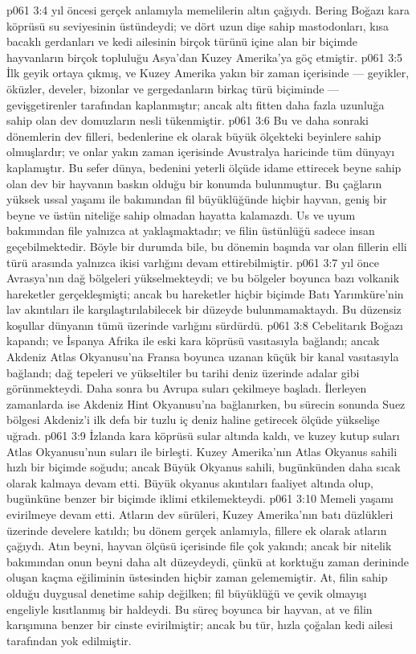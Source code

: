 \vs p061 3:4  yıl öncesi gerçek anlamıyla memelilerin altın çağıydı. Bering Boğazı kara köprüsü su seviyesinin üstündeydi; ve dört uzun dişe sahip mastodonları, kısa bacaklı gerdanları ve kedi ailesinin birçok türünü içine alan bir biçimde hayvanların birçok topluluğu Asya’dan Kuzey Amerika’ya göç etmiştir.
\vs p061 3:5 İlk geyik ortaya çıkmış, ve Kuzey Amerika yakın bir zaman içerisinde --- geyikler, öküzler, develer, bizonlar ve gergedanların birkaç türü biçiminde --- gevişgetirenler tarafından kaplanmıştır; ancak altı fitten daha fazla uzunluğa sahip olan dev domuzların nesli tükenmiştir.
\vs p061 3:6 Bu ve daha sonraki dönemlerin dev filleri, bedenlerine ek olarak büyük ölçekteki beyinlere sahip olmuşlardır; ve onlar yakın zaman içerisinde Avustralya haricinde tüm dünyayı kaplamıştır. Bu sefer dünya, bedenini yeterli ölçüde idame ettirecek beyne sahip olan dev bir hayvanın baskın olduğu bir konumda bulunmuştur. Bu çağların yüksek ussal yaşamı ile bakımından fil büyüklüğünde hiçbir hayvan, geniş bir beyne ve üstün niteliğe sahip olmadan hayatta kalamazdı. Us ve uyum bakımından file yalnızca at yaklaşmaktadır; ve filin üstünlüğü sadece insan geçebilmektedir. Böyle bir durumda bile, bu dönemin başında var olan fillerin elli türü arasında yalnızca ikisi varlığını devam ettirebilmiştir.
\vs p061 3:7  yıl önce Avrasya’nın dağ bölgeleri yükselmekteydi; ve bu bölgeler boyunca bazı volkanik hareketler gerçekleşmişti; ancak bu hareketler hiçbir biçimde Batı Yarımküre’nin lav akıntıları ile karşılaştırılabilecek bir düzeyde bulunmamaktaydı. Bu düzensiz koşullar dünyanın tümü üzerinde varlığını sürdürdü.
\vs p061 3:8 Cebelitarık Boğazı kapandı; ve İspanya Afrika ile eski kara köprüsü vasıtasıyla bağlandı; ancak Akdeniz Atlas Okyanusu’na Fransa boyunca uzanan küçük bir kanal vasıtasıyla bağlandı; dağ tepeleri ve yükseltiler bu tarihi deniz üzerinde adalar gibi görünmekteydi. Daha sonra bu Avrupa suları çekilmeye başladı. İlerleyen zamanlarda ise Akdeniz Hint Okyanusu’na bağlanırken, bu sürecin sonunda Suez bölgesi Akdeniz’i ilk defa bir tuzlu iç deniz haline getirecek ölçüde yükselişe uğradı.
\vs p061 3:9 İzlanda kara köprüsü sular altında kaldı, ve kuzey kutup suları Atlas Okyanusu’nun suları ile birleşti. Kuzey Amerika’nın Atlas Okyanus sahili hızlı bir biçimde soğudu; ancak Büyük Okyanus sahili, bugünkünden daha sıcak olarak kalmaya devam etti. Büyük okyanus akıntıları faaliyet altında olup, bugünküne benzer bir biçimde iklimi etkilemekteydi.
\vs p061 3:10 Memeli yaşamı evirilmeye devam etti. Atların dev sürüleri, Kuzey Amerika’nın batı düzlükleri üzerinde develere katıldı; bu dönem gerçek anlamıyla, fillere ek olarak atların çağıydı. Atın beyni, hayvan ölçüsü içerisinde file çok yakındı; ancak bir nitelik bakımından onun beyni daha alt düzeydeydi, çünkü at korktuğu zaman derininde oluşan kaçma eğiliminin üstesinden hiçbir zaman gelememiştir. At, filin sahip olduğu duygusal denetime sahip değilken; fil büyüklüğü ve çevik olmayışı engeliyle kısıtlanmış bir haldeydi. Bu süreç boyunca bir hayvan, at ve filin karışımına benzer bir cinste evirilmiştir; ancak bu tür, hızla çoğalan kedi ailesi tarafından yok edilmiştir.
